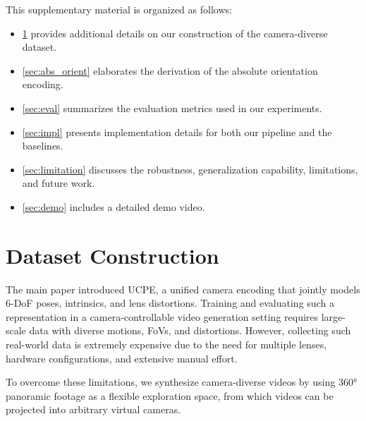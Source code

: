 \clearpage
\setcounter{page}{1}
\maketitlesupplementary

\renewcommand\thesection{\Alph{section}}
\renewcommand\thetable{\thesection.\arabic{table}}
\renewcommand\thefigure{\thesection.\arabic{figure}}
\renewcommand\theequation{\thesection.\arabic{equation}}
\setcounter{section}{0}

\renewcommand{\theHsection}{supp.\Alph{section}}
\renewcommand{\theHtable}{supp.\Alph{section}.\arabic{table}}
\renewcommand{\theHfigure}{supp.\Alph{section}.\arabic{figure}}
\renewcommand{\theHequation}{supp.\Alph{section}.\arabic{equation}}


This supplementary material is organized as follows:
\begin{itemize}
    \item \cref{sec:panshot} provides additional details on our construction of the camera-diverse dataset.
    \item \cref{sec:abs_orient} elaborates the derivation of the absolute orientation encoding.
    \item \cref{sec:eval} summarizes the evaluation metrics used in our experiments.
    \item \cref{sec:impl} presents implementation details for both our pipeline and the baselines.
    \item \cref{sec:limitation} discusses the robustness, generalization capability, limitations, and future work.
    \item \cref{sec:demo} includes a detailed demo video.
\end{itemize}



\section{Dataset Construction}
\label{sec:panshot}




The main paper introduced UCPE, a unified camera encoding that jointly models 6-DoF poses, intrinsics, and lens distortions.  
Training and evaluating such a representation in a camera-controllable video generation setting requires large-scale data with diverse motions, FoVs, and distortions.  
However, collecting such real-world data is extremely expensive due to the need for multiple lenses, hardware configurations, and extensive manual effort.

To overcome these limitations, we synthesize camera-diverse videos by using 360° panoramic footage as a flexible exploration space, from which videos can be projected into arbitrary virtual cameras.

